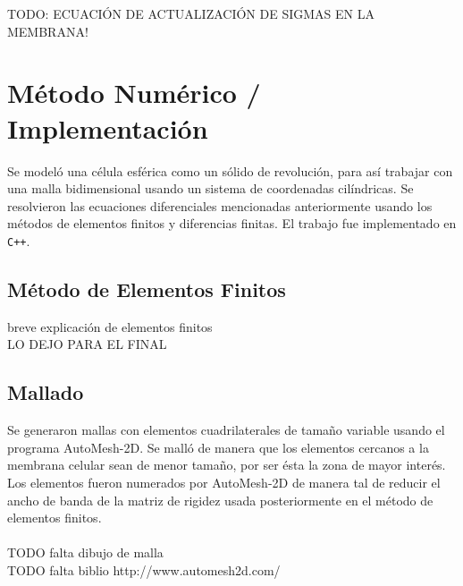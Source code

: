 \documentclass[a4paper,10pt]{article}
\begin{document}
TODO: ECUACIÓN DE ACTUALIZACIÓN DE SIGMAS EN LA MEMBRANA!

\section{Método Numérico / Implementación}


Se modeló una célula esférica como un sólido de revolución, para así trabajar con una malla bidimensional usando un sistema de coordenadas cilíndricas. Se resolvieron las ecuaciones diferenciales mencionadas anteriormente usando los métodos de elementos finitos y diferencias finitas. El trabajo fue implementado en \texttt{C++}.


\subsection{Método de Elementos Finitos}
breve explicación de elementos finitos 
\\LO DEJO PARA EL FINAL

%
%

\subsection{Mallado}
Se generaron mallas con elementos cuadrilaterales de tamaño variable usando el programa AutoMesh-2D. Se malló de manera que los elementos cercanos a la membrana celular sean de menor tamaño, por ser ésta la zona de mayor interés. Los elementos fueron numerados por AutoMesh-2D de manera tal de reducir el ancho de banda de la matriz de rigidez usada posteriormente en el método de elementos finitos.\\
\\TODO falta dibujo de malla
\\TODO falta biblio http://www.automesh2d.com/
\end{document}
